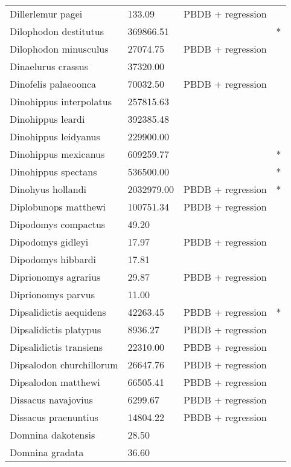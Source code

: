\documentclass{article}
\begin{document}
\begin{center}
\begin{longtable}{p{} p{} p{} p{}}
    Dillerlemur pagei & 133.09 & PBDB + regression &  \\ 
    Dilophodon destitutus & 369866.51 & \cite{Sinclair1915} & * \\ 
    Dilophodon minusculus & 27074.75 & PBDB + regression &  \\ 
    Dinaelurus crassus & 37320.00 & \cite{McKenna2011} &  \\ 
    Dinofelis palaeoonca & 70032.50 & PBDB + regression &  \\ 
    Dinohippus interpolatus & 257815.63 & \cite{Tomiya2013} &  \\ 
    Dinohippus leardi & 392385.48 & \cite{Tomiya2013} &  \\ 
    Dinohippus leidyanus & 229900.00 & \cite{MacFadden1986} &  \\ 
    Dinohippus mexicanus & 609259.77 & \cite{Tomiya2013} & * \\ 
    Dinohippus spectans & 536500.00 & \cite{McKenna2011} & * \\ 
    Dinohyus hollandi & 2032979.00 & PBDB + regression & * \\ 
    Diplobunops matthewi & 100751.34 & PBDB + regression &  \\ 
    Dipodomys compactus & 49.20 & \cite{Smith2004} &  \\ 
    Dipodomys gidleyi & 17.97 & PBDB + regression &  \\ 
    Dipodomys hibbardi & 17.81 & \cite{Tomiya2013} &  \\ 
    Diprionomys agrarius & 29.87 & PBDB + regression &  \\ 
    Diprionomys parvus & 11.00 & \cite{McKenna2011} &  \\ 
    Dipsalidictis aequidens & 42263.45 & PBDB + regression & * \\ 
    Dipsalidictis platypus & 8936.27 & PBDB + regression &  \\ 
    Dipsalidictis transiens & 22310.00 & PBDB + regression &  \\ 
    Dipsalodon churchillorum & 26647.76 & PBDB + regression &  \\ 
    Dipsalodon matthewi & 66505.41 & PBDB + regression &  \\ 
    Dissacus navajovius & 6299.67 & PBDB + regression &  \\ 
    Dissacus praenuntius & 14804.22 & PBDB + regression &  \\ 
    Domnina dakotensis & 28.50 & \cite{Tomiya2013} &  \\ 
    Domnina gradata & 36.60 & \cite{Tomiya2013} &  \\ 

\end{longtable}
\end{center}
\end{document}
